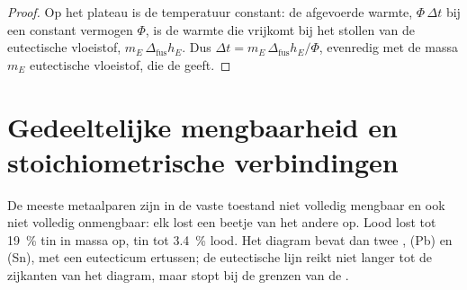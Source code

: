 \begin{proof}
Op het plateau is de temperatuur constant: de afgevoerde warmte, $\Phi\,\Delta t$
bij een constant vermogen $\Phi$, is de warmte die vrijkomt bij het stollen van de
eutectische vloeistof, $m_E\,\Delta_{\text{fus}}h_E$. Dus $\Delta t = m_E\,\Delta_{\text{fus}}h_E/
\Phi$, evenredig met de massa $m_E$ eutectische vloeistof, die de 
geeft.
\end{proof}

\section{Gedeeltelijke mengbaarheid en stoichiometrische verbindingen}

De meeste metaalparen zijn in de vaste toestand niet volledig mengbaar en ook niet volledig
onmengbaar: elk lost een beetje van het andere op. Lood lost tot 19~\% tin
in massa op, tin tot 3.4~\% lood. Het diagram bevat dan twee , (Pb) en (Sn), met een eutecticum ertussen; de eutectische lijn reikt
niet langer tot de zijkanten van het diagram, maar stopt bij de grenzen van de .

